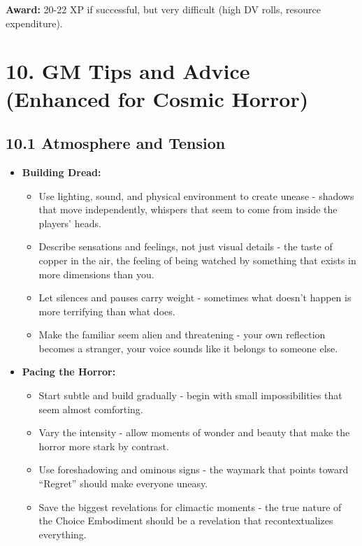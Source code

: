 \documentclass[11pt]{article}
\begin{document}
\textbf{Award:} 20-22 XP if successful, but very difficult (high DV rolls, resource expenditure).

\clearpage

\section*{10. GM Tips and Advice (Enhanced for Cosmic Horror)}

\subsection*{10.1 Atmosphere and Tension}

\begin{itemize}
\item \textbf{Building Dread:}
\begin{itemize}
\item Use lighting, sound, and physical environment to create unease - shadows that move independently, whispers that seem to come from inside the players' heads.
\item Describe sensations and feelings, not just visual details - the taste of copper in the air, the feeling of being watched by something that exists in more dimensions than you.
\item Let silences and pauses carry weight - sometimes what doesn't happen is more terrifying than what does.
\item Make the familiar seem alien and threatening - your own reflection becomes a stranger, your voice sounds like it belongs to someone else.
\end{itemize}
\item \textbf{Pacing the Horror:}
\begin{itemize}
\item Start subtle and build gradually - begin with small impossibilities that seem almost comforting.
\item Vary the intensity - allow moments of wonder and beauty that make the horror more stark by contrast.
\item Use foreshadowing and ominous signs - the waymark that points toward ``Regret'' should make everyone uneasy.
\item Save the biggest revelations for climactic moments - the true nature of the Choice Embodiment should be a revelation that recontextualizes everything.
\end{itemize}
\end{itemize}
\end{document}
